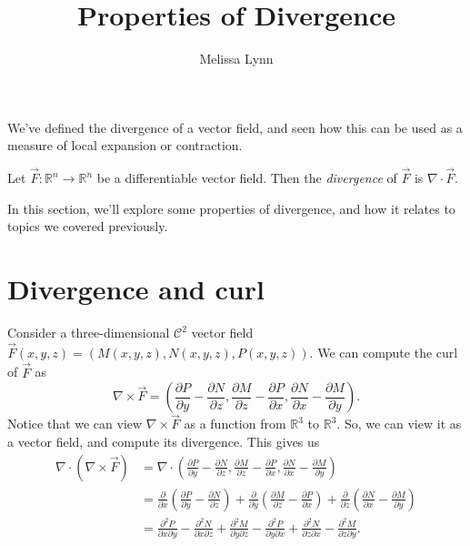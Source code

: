 \documentclass{ximera}
\title{Properties of Divergence}
\author{Melissa Lynn}
\begin{document}
  
\begin{abstract}  
\end{abstract}  
\maketitle  

We've defined the divergence of a vector field, and seen how this can be used as a measure of local expansion or contraction.

\begin{definition}
Let $\vec{F}:\mathbb{R}^n\rightarrow\mathbb{R}^n$ be a differentiable vector field. Then the \emph{divergence} of $\vec{F}$ is $\nabla\cdot \vec{F}$.
\end{definition}

In this section, we'll explore some properties of divergence, and how it relates to topics we covered previously.

\section*{Divergence and curl}

Consider a three-dimensional $\mathcal{C}^2$ vector field $\vec{F}(x,y,z) = (M(x,y,z), N(x,y,z), P(x,y,z))$. We can compute the curl of $\vec{F}$ as
\[
\nabla\times \vec{F} = \left(\frac{\partial P}{\partial y} - \frac{\partial N}{\partial z}, \frac{\partial M}{\partial z} - \frac{\partial P}{\partial x}, \frac{\partial N}{\partial x} - \frac{\partial M}{\partial y}\right).
\]
Notice that we can view $\nabla\times \vec{F}$ as a function from $\mathbb{R}^3$ to $\mathbb{R}^3$. So, we can view it as a vector field, and compute its divergence. This gives us
\begin{align*}
\nabla\cdot (\nabla\times \vec{F}) &= \nabla\cdot \left(\frac{\partial P}{\partial y} - \frac{\partial N}{\partial z}, \frac{\partial M}{\partial z} - \frac{\partial P}{\partial x}, \frac{\partial N}{\partial x} - \frac{\partial M}{\partial y}\right)\\
&= \frac{\partial}{\partial x}\left(\frac{\partial P}{\partial y} - \frac{\partial N}{\partial z}\right) + \frac{\partial}{\partial y}\left(\frac{\partial M}{\partial z} - \frac{\partial P}{\partial x}\right) + \frac{\partial}{\partial z}\left(\frac{\partial N}{\partial x} - \frac{\partial M}{\partial y}\right)\\
&= \frac{\partial^2 P}{\partial x \partial y} - \frac{\partial^2 N}{\partial x \partial z} + \frac{\partial^2 M}{\partial y \partial z} - \frac{\partial^2 P}{\partial y\partial x} + \frac{\partial^2 N}{\partial z\partial x} - \frac{\partial^2 M}{\partial z\partial y}.
\end{align*}
\end{document}
